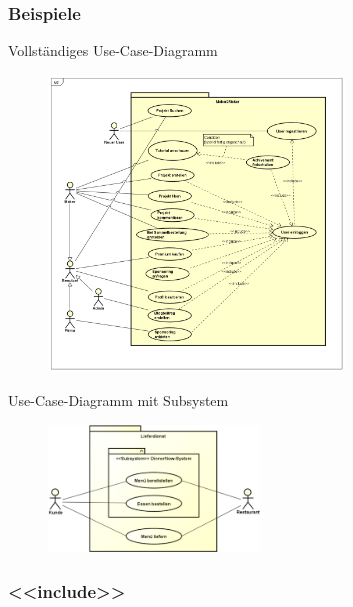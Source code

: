 \documentclass[11pt, a4paper]{article}
\begin{document}
\newpage

\subsubsection*{Beispiele}
\vspace{1em}

\centering Vollständiges Use-Case-Diagramm \\
\begin{figure}[h]
    \centering
    \includegraphics[width=0.70\textwidth]{UseCase-07.png}
    \label{fig:UseCase-07}
\end{figure}

\vspace{1em}

\centering Use-Case-Diagramm mit Subsystem \\
\begin{figure}[h]
    \centering
    \includegraphics[width=0.5\textwidth]{UseCase-10.png}
    \label{fig:UseCase-10}
\end{figure}

\newpage



\raggedright \subsubsection{<<include>>}
\end{document}
